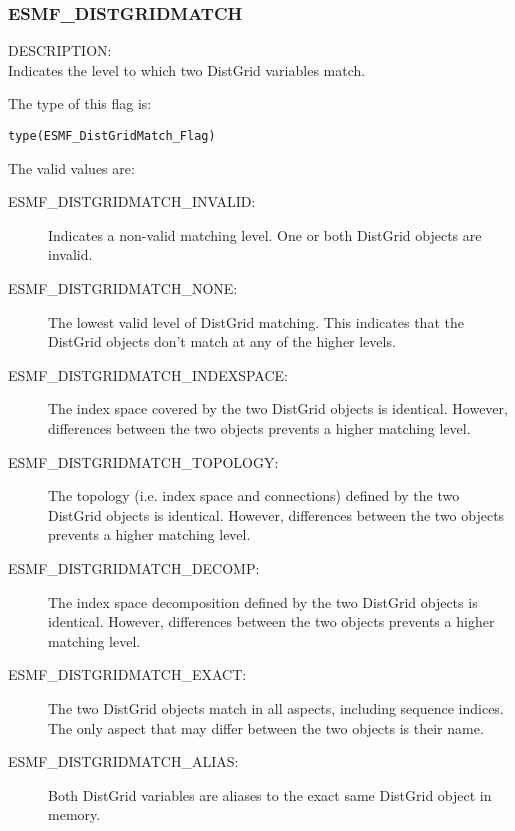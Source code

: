 

\subsubsection{ESMF\_DISTGRIDMATCH}
\label{const:distgridmatch}

{\sf DESCRIPTION:\\}
Indicates the level to which two DistGrid variables match.

The type of this flag is:

{\tt type(ESMF\_DistGridMatch\_Flag)}

The valid values are:
\begin{description}
\item [ESMF\_DISTGRIDMATCH\_INVALID:] Indicates a non-valid matching level. One
  or both DistGrid objects are invalid.
\item [ESMF\_DISTGRIDMATCH\_NONE:] The lowest valid level of DistGrid matching. 
  This indicates that the DistGrid objects don't match at any of the higher
  levels.
\item [ESMF\_DISTGRIDMATCH\_INDEXSPACE:] The index space covered by the two
  DistGrid objects is identical. However, differences between the two objects
  prevents a higher matching level.
\item [ESMF\_DISTGRIDMATCH\_TOPOLOGY:] The topology (i.e. index space and 
  connections) defined by the two DistGrid objects is identical. However, 
  differences between the two objects prevents a higher matching level.
\item [ESMF\_DISTGRIDMATCH\_DECOMP:] The index space decomposition defined by
   the two DistGrid objects is identical. However, differences between the two
   objects prevents a higher matching level.
\item [ESMF\_DISTGRIDMATCH\_EXACT:] The two DistGrid objects match in all 
  aspects, including sequence indices. The only aspect that may differ between
  the two objects is their name.
\item [ESMF\_DISTGRIDMATCH\_ALIAS:] Both DistGrid variables are aliases to the
  exact same DistGrid object in memory.
\end{description}

